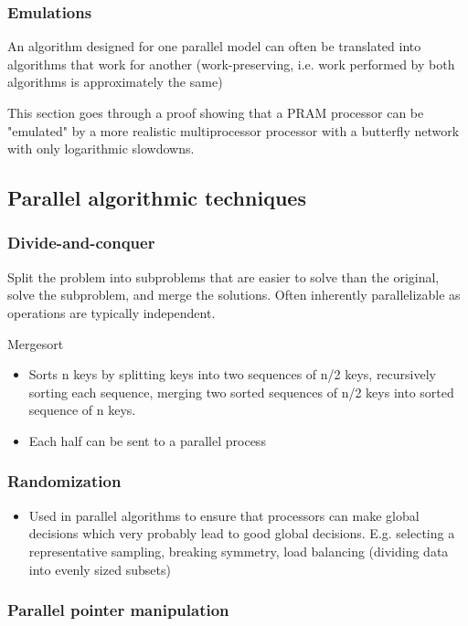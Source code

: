 \subsubsection{Emulations}

An algorithm designed for one parallel model can often be translated into algorithms that work for another (work-preserving, i.e. work performed by both algorithms is approximately the same)

This section goes through a proof showing that a PRAM processor can be "emulated" by a more realistic multiprocessor processor with a butterfly network with only logarithmic slowdowns.

\subsection{Parallel algorithmic techniques}

\subsubsection{Divide-and-conquer}

Split the problem into subproblems that are easier to solve than the original, solve the subproblem, and merge the solutions. Often inherently parallelizable as operations are typically independent.

Mergesort
\begin{itemize}
    \item Sorts n keys by splitting keys into two sequences of n/2 keys, recursively sorting each sequence, merging two sorted sequences of n/2 keys into sorted sequence of n keys.
    \item Each half can be sent to a parallel process
\end{itemize}

\subsubsection{Randomization}
\begin{itemize}
    \item Used in parallel algorithms to ensure that processors can make global decisions which very probably lead to good global decisions. E.g. selecting a representative sampling, breaking symmetry, load balancing (dividing data into evenly sized subsets)
\end{itemize}

\subsubsection{Parallel pointer manipulation}


